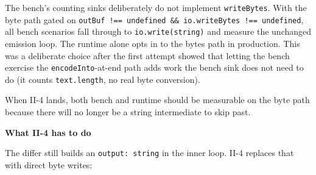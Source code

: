 The bench's counting sinks deliberately do not implement \texttt{w\allowbreak{}r\allowbreak{}i\allowbreak{}t\allowbreak{}e\allowbreak{}B\allowbreak{}y\allowbreak{}t\allowbreak{}e\allowbreak{}s}. With the byte path gated on \texttt{o\allowbreak{}u\allowbreak{}t\allowbreak{}B\allowbreak{}u\allowbreak{}f\allowbreak{} \allowbreak{}!\allowbreak{}=\allowbreak{}=\allowbreak{} \allowbreak{}u\allowbreak{}n\allowbreak{}d\allowbreak{}e\allowbreak{}f\allowbreak{}i\allowbreak{}n\allowbreak{}e\allowbreak{}d\allowbreak{} \allowbreak{}\&\allowbreak{}\&\allowbreak{} \allowbreak{}i\allowbreak{}o\allowbreak{}.\allowbreak{}w\allowbreak{}r\allowbreak{}i\allowbreak{}t\allowbreak{}e\allowbreak{}B\allowbreak{}y\allowbreak{}t\allowbreak{}e\allowbreak{}s\allowbreak{} \allowbreak{}!\allowbreak{}=\allowbreak{}=\allowbreak{} \allowbreak{}u\allowbreak{}n\allowbreak{}d\allowbreak{}e\allowbreak{}f\allowbreak{}i\allowbreak{}n\allowbreak{}e\allowbreak{}d}, all bench scenarios fall through to \texttt{i\allowbreak{}o\allowbreak{}.\allowbreak{}w\allowbreak{}r\allowbreak{}i\allowbreak{}t\allowbreak{}e\allowbreak{}(\allowbreak{}s\allowbreak{}t\allowbreak{}r\allowbreak{}i\allowbreak{}n\allowbreak{}g\allowbreak{})} and measure the unchanged emission loop. The runtime alone opts in to the bytes path in production. This was a deliberate choice after the first attempt showed that letting the bench exercise the \texttt{e\allowbreak{}n\allowbreak{}c\allowbreak{}o\allowbreak{}d\allowbreak{}e\allowbreak{}I\allowbreak{}n\allowbreak{}t\allowbreak{}o}-at-end path adds work the bench sink does not need to do (it counts \texttt{t\allowbreak{}e\allowbreak{}x\allowbreak{}t\allowbreak{}.\allowbreak{}l\allowbreak{}e\allowbreak{}n\allowbreak{}g\allowbreak{}t\allowbreak{}h}, no real byte conversion).

When II-4 lands, both bench and runtime should be measurable on the byte path because there will no longer be a string intermediate to skip past.

\textbf{What II-4 has to do}

The differ still builds an \texttt{o\allowbreak{}u\allowbreak{}t\allowbreak{}p\allowbreak{}u\allowbreak{}t\allowbreak{}:\allowbreak{} \allowbreak{}s\allowbreak{}t\allowbreak{}r\allowbreak{}i\allowbreak{}n\allowbreak{}g} in the inner loop. II-4 replaces that with direct byte writes:

